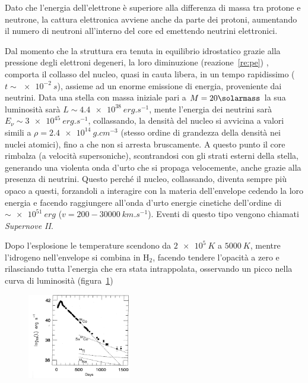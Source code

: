 Dato che l'energia dell'elettrone è superiore alla differenza di massa tra protone e neutrone, la cattura elettronica avviene anche da parte dei protoni, aumentando il numero di neutroni all'interno del core ed emettendo neutrini elettronici.

Dal momento che la struttura era tenuta in equilibrio idrostatico grazie alla pressione degli elettroni degeneri, la loro diminuzione (reazione~\ref{re:pe}) , comporta il collasso del nucleo, quasi in cauta libera, in un tempo rapidissimo ($t \sim \SI{e-2}{s}$), assieme ad un enorme emissione di energia, proveniente dai neutrini. Data una stella con massa iniziale pari a $M = 20\si{\solarmass}$ la sua luminosità sarà $L \sim \SI{4.4e38}{erg.s^{-1}}$, mente l'energia dei neutrini sarà $E_\nu \sim \SI{3e45}{erg.s^{-1}}$, collassando, la densità del nucleo si avvicina a valori simili a $\rho = \SI{2.4e14}{g.cm^{-3}}$ (stesso ordine di grandezza della densità nei nuclei atomici), fino a che non si arresta bruscamente. A questo punto il core rimbalza (a velocità supersoniche), scontrandosi con gli strati esterni della stella, generando una violenta onda d'urto che si propaga velocemente, anche grazie alla presenza di neutrini. Questo perché il nucleo, collassando, diventa sempre più opaco a questi, forzandoli a interagire con la materia dell'envelope cedendo la loro energia e facendo raggiungere all'onda d'urto energie cinetiche dell'ordine di $\sim \SI{e51}{erg}$ ($v = 200-\SI{30000}{km.s^{-1}}$). Eventi di questo tipo vengono chiamati \textit{Supernove II}.

Dopo l'esplosione le temperature scendono da $\SI{2e5}{K}$ a $\SI{5000}{K}$, mentre l'idrogeno nell'envelope si combina in $\mbox{H}_2$, facendo tendere l'opacità a zero e rilasciando tutta l'energia che era stata intrappolata, osservando un picco nella curva di luminosità (figura~\ref{fig:supernova})
\begin{figure}
    \centering
    \includegraphics[width = 0.4\textwidth]{immagini/supernova.png}
    \caption{}\label{fig:supernova}
\end{figure}

